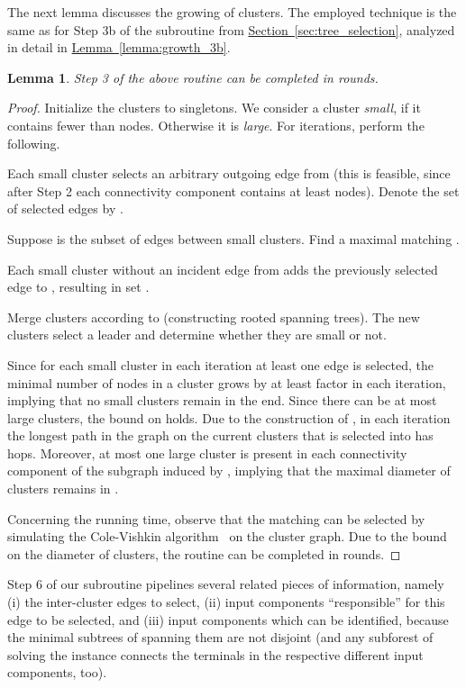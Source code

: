 \documentclass[letterpaper,11pt]{article}
\newtheorem{lemma}[theorem]{Lemma}
\newcommand{\namedref}[2]{\hyperref[#2]{#1~\ref*{#2}}}
\newcommand{\sectionref}[1]{\namedref{Section}{#1}}
\newcommand{\lemmaref}[1]{\namedref{Lemma}{#1}}
\begin{document}
The next lemma discusses the growing of clusters. The employed technique is the
same as for Step 3b of the subroutine from \sectionref{sec:tree_selection},
analyzed in detail in \lemmaref{lemma:growth_3b}.

\begin{lemma}\label{lemma:prune_3}
Step 3 of the above routine can be completed in  rounds.
\end{lemma}
\begin{proof}
Initialize the clusters to singletons. We consider a cluster \emph{small}, if it
contains fewer than  nodes. Otherwise it is \emph{large}. For  iterations, perform the following.
\begin{compactenum}
\item Each small cluster selects an arbitrary outgoing edge from  (this is
feasible, since after Step 2 each connectivity component contains at least
 nodes). Denote the set of selected edges by .
\item Suppose  is the subset of edges between small clusters. Find a
maximal matching .
\item Each small cluster without an incident edge from  adds the previously
selected edge to , resulting in set .
\item Merge clusters according to  (constructing rooted spanning trees).
The new clusters select a leader and determine whether they are small or not.
\end{compactenum}
Since for each small cluster in each iteration at least one edge is selected,
the minimal number of nodes in a cluster grows by at least factor  in each
iteration, implying that no small clusters remain in the end. Since there can be
at most  large clusters, the bound on 
holds. Due to the construction of , in each iteration the longest path in
the graph on the current clusters that is selected into  has  hops.
Moreover, at most one large cluster is present in each connectivity component of
the subgraph induced by , implying that the maximal diameter of clusters
remains in .

Concerning the running time, observe that the matching can be selected by
simulating the Cole-Vishkin algorithm~\cite{CV-86} on the cluster graph. Due to
the bound on the diameter of clusters, the routine can be completed in
 rounds.
\end{proof}

Step 6 of our subroutine pipelines several related pieces of information, namely
(i) the inter-cluster edges to select, (ii) input components ``responsible'' for
this edge to be selected, and (iii) input components which can be identified,
because the minimal subtrees of  spanning them are not disjoint (and any
subforest of  solving the instance connects the terminals in the respective
different input components, too).
\end{document}
